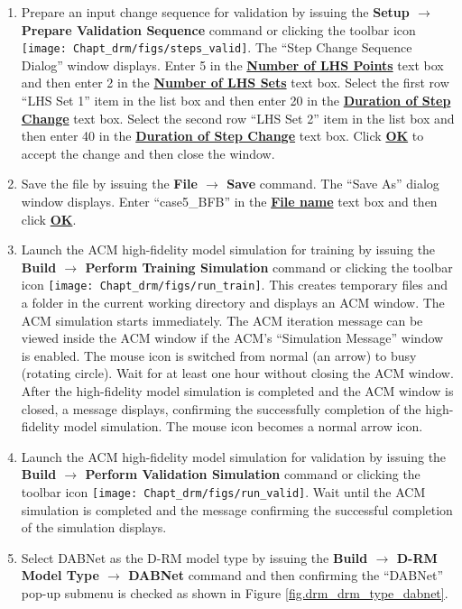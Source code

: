 \begin{enumerate}
	\item Prepare an input change sequence for validation by issuing the \textbf{Setup $\rightarrow$ Prepare Validation Sequence} command or clicking the toolbar icon \texttt{[image: Chapt\_drm/figs/steps\_valid]}.  The ``Step Change Sequence Dialog'' window displays.  Enter 5 in the \textbf{\underline{Number of LHS Points}} text box and then enter 2 in the \textbf{\underline{Number of LHS Sets}} text box.  Select the first row ``LHS Set 1'' item in the list box and then enter 20 in the \textbf{\underline{Duration of Step Change}} text box.  Select the second row ``LHS Set 2'' item in the list box and then enter 40 in the \textbf{\underline{Duration of Step Change}} text box.  Click \textbf{\underline{OK}} to accept the change and then close the window.
	\item Save the file by issuing the \textbf{File $\rightarrow$ Save} command.  The ``Save As'' dialog window displays.  Enter ``case5\_BFB'' in the \textbf{\underline{File name}} text box and then click \textbf{\underline{OK}}.
	\item Launch the ACM high-fidelity model simulation for training by issuing the \textbf{Build $\rightarrow$ Perform Training Simulation} command or clicking the toolbar icon \texttt{[image: Chapt\_drm/figs/run\_train]}.  This creates temporary files and a folder in the current working directory and displays an ACM window.  The ACM simulation starts immediately.  The ACM iteration message can be viewed inside the ACM window if the ACM’s ``Simulation Message'' window is enabled.  The mouse icon is switched from normal (an arrow) to busy (rotating circle).  Wait for at least one hour without closing the ACM window.  After the high-fidelity model simulation is completed and the ACM window is closed, a message displays, confirming the successfully completion of the high-fidelity model simulation.  The mouse icon becomes a normal arrow icon.
	\item Launch the ACM high-fidelity model simulation for validation by issuing the \textbf{Build $\rightarrow$ Perform Validation Simulation} command or clicking the toolbar icon \texttt{[image: Chapt\_drm/figs/run\_valid]}.  Wait until the ACM simulation is completed and the message confirming the successful completion of the simulation displays.
	\item Select DABNet as the D-RM model type by issuing the \textbf{Build $\rightarrow$ D-RM Model Type $\rightarrow$ DABNet} command and then confirming the ``DABNet'' pop-up submenu is checked as shown in Figure \ref{fig.drm_drm_type_dabnet}.

\end{enumerate}
